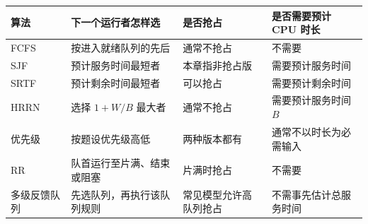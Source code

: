 \begin{wideblock}

\par\medskip\noindent\begin{minipage}{\linewidth}\fontsize{9.3}{12}\selectfont\begin{tabularx}{\linewidth}{@{}YYYY@{}}
\toprule\noalign{}
\begin{minipage}[b]{\linewidth}\raggedright
算法
\end{minipage} & \begin{minipage}[b]{\linewidth}\raggedright
下一个运行者怎样选
\end{minipage} & \begin{minipage}[b]{\linewidth}\raggedright
是否抢占
\end{minipage} & \begin{minipage}[b]{\linewidth}\raggedright
是否需要预计 CPU 时长
\end{minipage} \\
\midrule\noalign{}


FCFS & 按进入就绪队列的先后 & 通常不抢占 & 不需要 \\
SJF & 预计服务时间最短者 & 本章指非抢占版 & 需要预计服务时间 \\
SRTF & 预计剩余时间最短者 & 可以抢占 & 需要预计剩余时间 \\
HRRN & 选择 \(1+W/B\) 最大者 & 通常不抢占 & 需要预计服务时间 \(B\) \\
优先级 & 按题设优先级高低 & 两种版本都有 & 通常不以时长为必需输入 \\
RR & 队首运行至片满、结束或阻塞 & 片满时抢占 & 不需要 \\
多级反馈队列 & 先选队列，再执行该队列规则 & 常见模型允许高队列抢占 & 不需事先估计总服务时间 \\
\bottomrule\end{tabularx}
\end{minipage}\par\medskip

\end{wideblock}

